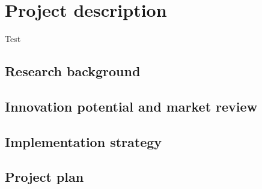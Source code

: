 \newpage
\section{Project description}

Test \cite{perera2017pollution}

\subsection{Research background}

\subsection{Innovation potential and market review} 

\subsection{Implementation strategy}

\subsection{Project plan}

